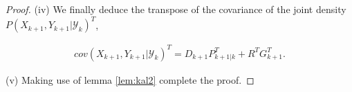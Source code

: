 \documentclass{article}
\theoremstyle{definition}
\theoremstyle{remark}
\newcommand{\filtrationObs}[1]{\ensuremath{\mathscr{Y}_{#1}}}
\begin{document}
\begin{proof}
(iv) We finally deduce the transpose of the covariance of the joint density $P(X_{k+1}, Y_{k+1}|\filtrationObs{k})^T$,


\begin{align*}
cov(X_{k+1}, Y_{k+1}|\filtrationObs{k})^T=D_{k+1}P_{k+1|k}^T+R^TG_{k+1}^T.
\end{align*}

(v) Making use of lemma \eqref{lem:kal2} complete the proof.
\end{proof}








\end{document}
